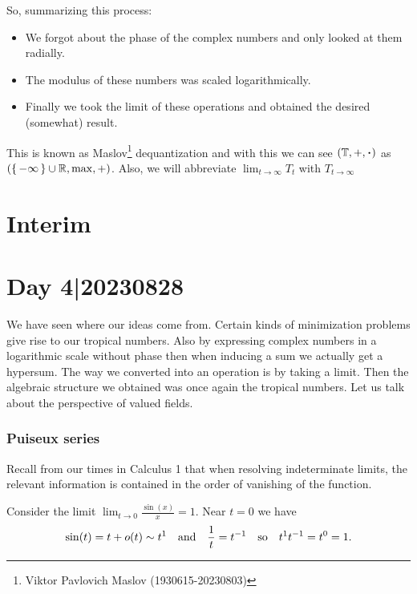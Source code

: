 \documentclass[12pt]{memoir}
\begin{document}
So, summarizing this process:
\begin{itemize}
    \item We forgot about the phase of the complex numbers and only looked at them radially. 
    \item The modulus of these numbers was scaled logarithmically.
    \item Finally we took the limit of these operations and obtained the desired (somewhat) result.
\end{itemize}
This is known as Maslov\footnote{Viktor Pavlovich Maslov (1930615-20230803)} dequantization and with this we can see $(\bT,+,\.)$ as $(\{\,-\infty\,\}\cup\mathbb{R},\max,+)$. Also, we will abbreviate $\lim_{t\to\infty}T_t$ with $T_{t\to\infty}$

\section{Interim}

\section{Day 4|20230828}

We have seen where our ideas come from. Certain kinds of minimization problems give rise to our tropical numbers. Also by expressing complex numbers in a logarithmic scale without phase then when inducing a sum we actually get a hypersum. The way we converted into an operation is by taking a limit. Then the algebraic structure we obtained was once again the tropical numbers. Let us talk about the perspective of valued fields.
\subsubsection{Puiseux series}
Recall from our times in Calculus 1 that when resolving indeterminate limits, the relevant information is contained in the order of vanishing of the function.

\begin{Ex}
    Consider the limit $\lim_{t\to 0}\frac{\sin(x)}{x}=1$. Near $t=0$ we have 
    $$\sin(t)=t+o(t)\sim t^1\quad\text{and}\quad\frac{1}{t}=t^{-1}\quad\text{so}\quad t^1t^{-1}=t^0=1.$$
\end{Ex}
\end{document}
